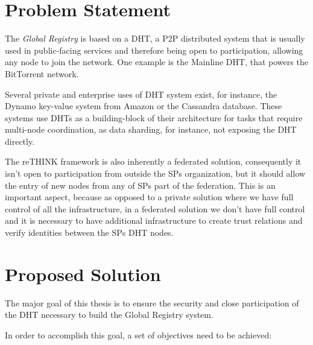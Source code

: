 \section{Problem Statement}
\label{section:problem-statement}

The \textit{Global Registry} is based on a \ac{DHT}, a \ac{P2P} distributed system  that is usually used in public-facing services and therefore being open to participation, allowing any node to join the network.
One example is the Mainline \ac{DHT}, that powers the BitTorrent network.

Several private and enterprise uses of DHT system exist, for instance, the Dynamo\cite{dynamo2007} key-value system from Amazon or the Cassandra\cite{cassandra2010} database.
These systems use \acp{DHT} as a building-block of their architecture for tasks that require multi-node coordination, as data sharding, for instance, not exposing the \ac{DHT} directly.

The reTHINK framework is also inherently a federated solution, consequently it isn't open to participation from outside the \acp{SP} organization, but it should allow the entry of new nodes from any of \acp{SP} part of the federation.
This is an important aspect, because as opposed to a private solution where we have full control of all the infrastructure, in a federated solution we don't have full control and it is necessary to have additional infrastructure to create trust relations and verify identities between the \acp{SP} \ac{DHT} nodes.

\section{Proposed Solution}
\label{section:proposed}

The major goal of this thesis is to ensure the security and close participation of the \ac{DHT} necessary to build the Global Registry system.

In order to accomplish this goal, a set of objectives need to be achieved:

